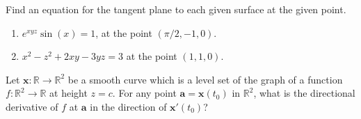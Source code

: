 \documentclass{ximera}
\begin{document}
\begin{problem}
Find an equation for the tangent plane to each given surface at the given point.

\begin{enumerate}

\item $e^{xyz}\sin(x) = 1$, at the point $(\pi/2,-1,0)$.

\item $x^2 - z^2 + 2xy - 3yz = 3$ at the point $(1,1,0)$.

\end{enumerate}
\end{problem}

\begin{problem}
 Let $\mathbf{x}:\mathbb{R}\rightarrow\mathbb{R}^2$ be a smooth curve which is a level set of the graph of a function $f:\mathbb{R}^2\rightarrow\mathbb{R}$ at height $z = c$. For any point $\mathbf{a} = \mathbf{x}(t_0)$ in $\mathbb{R}^2$, what is the directional derivative of $f$ at $\mathbf{a}$ in the direction of $\mathbf{x}'(t_0)$?
 \end{problem}
\end{document}
